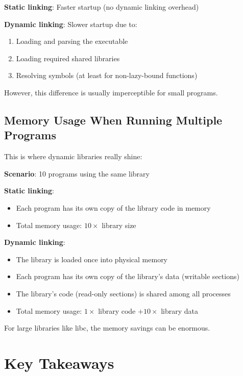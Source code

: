 \textbf{Static linking}: Faster startup (no dynamic linking overhead)

\textbf{Dynamic linking}: Slower startup due to:
\begin{enumerate}
    \item Loading and parsing the executable
    \item Loading required shared libraries
    \item Resolving symbols (at least for non-lazy-bound functions)
\end{enumerate}

However, this difference is usually imperceptible for small programs.

\subsection{Memory Usage When Running Multiple Programs}

This is where dynamic libraries really shine:

\textbf{Scenario}: 10 programs using the same library

\textbf{Static linking}:
\begin{itemize}
    \item Each program has its own copy of the library code in memory
    \item Total memory usage: $10 \times$ library size
\end{itemize}

\textbf{Dynamic linking}:
\begin{itemize}
    \item The library is loaded once into physical memory
    \item Each program has its own copy of the library's data (writable sections)
    \item The library's code (read-only sections) is shared among all processes
    \item Total memory usage: $1 \times$ library code $+ 10 \times$ library data
\end{itemize}

For large libraries like libc, the memory savings can be enormous.

\section{Key Takeaways}

